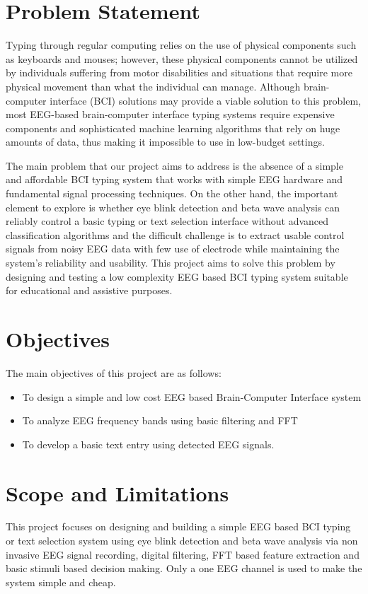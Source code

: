 \section{Problem Statement}
Typing through regular computing relies on the use of physical components such as keyboards and mouses; however, these physical components cannot be utilized by individuals suffering from motor disabilities and situations that require more physical movement than what the individual can manage. Although brain-computer interface (BCI) solutions may provide a viable solution to this problem, most EEG-based brain-computer interface typing systems require expensive components and sophisticated machine learning algorithms that rely on huge amounts of data, thus making it impossible to use in low-budget settings.

The main problem that our project aims to address is the absence of a simple and affordable BCI typing system that works with simple EEG hardware and fundamental signal processing techniques. On the other hand, the important element to explore is whether eye blink detection and beta wave analysis can reliably control a basic typing or text selection interface without advanced classification algorithms and the difficult challenge is to extract usable control signals from noisy EEG data with few use of electrode while maintaining the system's reliability and usability. This project aims to solve this problem by designing and testing a low complexity EEG based BCI typing system suitable for educational and assistive purposes.


\section{Objectives}
The main objectives of this project are as follows:
\begin{itemize}
	\item To design a simple and low cost EEG based Brain-Computer Interface system
	\item To analyze EEG frequency bands using basic filtering and FFT
	\item To develop a basic text entry using detected EEG signals.
\end{itemize}



\section{Scope and Limitations}
This project focuses on designing and building a simple EEG based BCI typing or text selection system using eye blink detection and beta wave analysis via non invasive EEG signal recording, digital filtering, FFT based feature extraction and basic stimuli based decision making. Only a one EEG channel is used to make the system simple and cheap.

